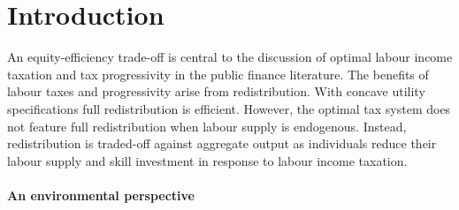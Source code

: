 
\section{Introduction}
An equity-efficiency trade-off is central to the discussion of optimal labour income taxation and tax progressivity in the public finance literature.  The benefits of labour taxes and progressivity arise from redistribution. With concave utility specifications full redistribution is efficient. However, the optimal tax system does not feature full redistribution when labour supply is endogenous. Instead, redistribution is traded-off against aggregate output as individuals reduce their labour supply and skill investment in response to labour income taxation. 

\paragraph{An environmental perspective}

